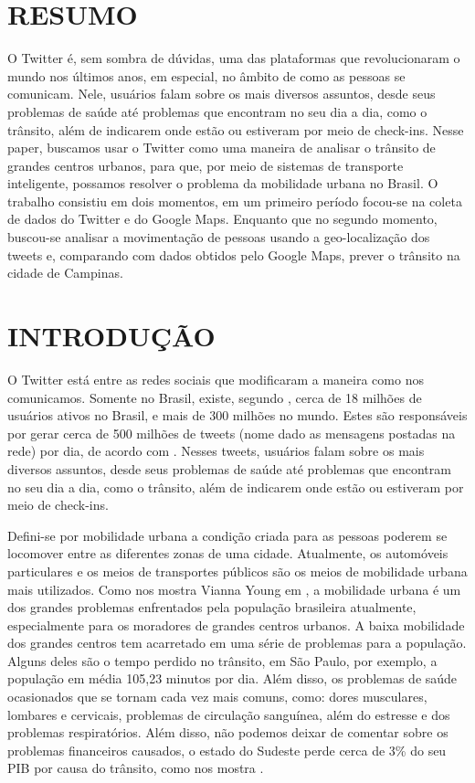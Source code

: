 \section*{RESUMO}
O Twitter é, sem sombra de dúvidas, uma das plataformas que revolucionaram o mundo nos últimos anos, em especial, no âmbito de como as pessoas se comunicam. Nele, usuários falam sobre os mais diversos assuntos, desde seus problemas de saúde até problemas que encontram no seu dia a dia, como o trânsito, além de indicarem onde estão ou estiveram por meio de check-ins. Nesse paper, buscamos usar o Twitter como uma maneira de analisar o trânsito de grandes centros urbanos, para que, por meio de sistemas de transporte inteligente, possamos resolver o problema da mobilidade urbana no Brasil. O trabalho consistiu em dois momentos, em um primeiro período focou-se na coleta de dados do Twitter e do Google Maps. Enquanto que no segundo momento, buscou-se analisar a movimentação de pessoas usando a geo-localização dos tweets e, comparando com dados obtidos pelo Google Maps, prever o trânsito na cidade de Campinas.

\section{INTRODUÇÃO}
O Twitter está entre as redes sociais que modificaram a maneira como nos comunicamos. Somente no Brasil, existe, segundo \cite{ref:statista}, cerca de 18 milhões de usuários ativos no Brasil, e mais de 300 milhões no mundo. Estes são responsáveis por gerar cerca de 500 milhões de tweets (nome dado as mensagens postadas na rede) por dia, de acordo com \cite{ref:twitter_stats}. Nesses tweets, usuários falam sobre os mais diversos assuntos, desde seus problemas de saúde até problemas que encontram no seu dia a dia, como o trânsito, além de indicarem onde estão ou estiveram por meio de check-ins.

Defini-se por mobilidade urbana a condição criada para as pessoas poderem se locomover entre as diferentes zonas de uma cidade. Atualmente, os automóveis particulares e os meios de transportes públicos são os meios de mobilidade urbana mais utilizados. Como nos mostra Vianna  Young em \cite{vianna2015busca}, a mobilidade urbana é um dos grandes problemas enfrentados pela população brasileira atualmente, especialmente para os moradores de grandes centros urbanos. A baixa mobilidade dos grandes centros tem acarretado em uma série de problemas para a população. Alguns deles são o tempo perdido no trânsito, em São Paulo, por exemplo, a população em média 105,23 minutos por dia. Além disso, os problemas de saúde ocasionados que se tornam cada vez mais comuns, como: dores musculares, lombares e cervicais, problemas de circulação sanguínea, além do estresse e dos problemas respiratórios. Além disso, não podemos deixar de comentar sobre os problemas financeiros causados, o estado do Sudeste perde cerca de 3\% do seu PIB por causa do trânsito, como nos mostra \cite{vianna2015busca}.

